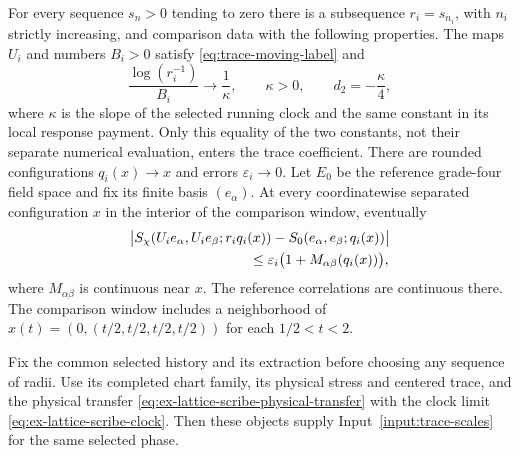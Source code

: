 \begin{assumption}\label{input:trace-scales}
For every sequence $s_n>0$ tending to zero there is a subsequence
$r_i=s_{n_i}$, with $n_i$ strictly increasing, and comparison data with
the following properties. The maps $U_i$ and numbers $B_i>0$ satisfy
\eqref{eq:trace-moving-label} and
\[
 \frac{\log(r_i^{-1})}{B_i}\longrightarrow\frac1\kappa,
 \qquad \kappa>0,\qquad d_2=-\frac\kappa4,
\]
where $\kappa$ is the slope of the selected running clock and the same
constant in its local response payment. Only this equality of the two
constants, not their separate numerical evaluation, enters the trace
coefficient.
There are rounded configurations $q_i(x)\to x$ and errors
$\varepsilon_i\to0$. Let $E_0$ be the reference grade-four field space
and fix its finite basis $(e_\alpha)$. At every coordinatewise separated
configuration $x$ in the interior of the comparison window, eventually
\begin{align}
 &\bigl|S_\chi(U_ie_\alpha,U_ie_\beta;r_iq_i(x))
                    -S_0(e_\alpha,e_\beta;q_i(x))\bigr|\nonumber\\
 &\hspace{30mm}\leq\varepsilon_i\bigl(1+M_{\alpha\beta}(q_i(x))\bigr),
 \label{eq:trace-basis-error}
\end{align}
where $M_{\alpha\beta}$ is continuous near $x$. The reference correlations
are continuous there. The comparison window includes a neighborhood of
$x(t)=(0,(t/2,t/2,t/2,t/2))$ for each $1/2<t<2$.
\end{assumption}
\begin{proposition}
\label{prop:trace-scale-supplier}
Fix the common selected history and its extraction before choosing any
sequence of radii. Use its completed chart family, its physical stress and
centered trace, and the physical transfer
\eqref{eq:ex-lattice-scribe-physical-transfer} with the clock limit
\eqref{eq:ex-lattice-scribe-clock}. Then these objects supply
Input~\ref{input:trace-scales} for the same selected phase.
\end{proposition}
